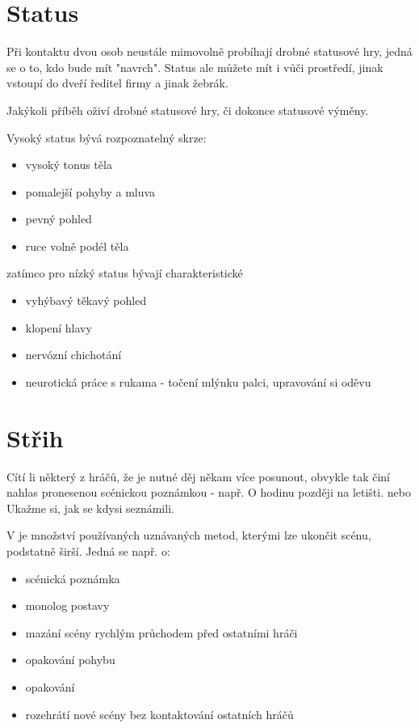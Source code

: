 \documentclass[main.tex]{subfiles}
\begin{document}
 
\needspace{5cm} \section{Status} \label{status} Při kontaktu dvou osob neustále mimovolně probíhají drobné statusové hry, 
jedná se o to, kdo bude mít "navrch". Status ale můžete mít i vůči prostředí, jinak vstoupí do  
dveří ředitel firmy a jinak žebrák. 
 
Jakýkoli příběh oživí drobné statusové hry, či dokonce statusové výměny. 
 
 
Vysoký status bývá rozpoznatelný skrze: 
\begin{itemize}
\item vysoký tonus těla
\item pomalejší pohyby a mluva
\item pevný pohled
\item ruce volně podél těla
\end{itemize}
zatímco pro  nízký status bývají charakteristické 
\begin{itemize}
\item vyhýbavý těkavý pohled
\item klopení hlavy
\item nervózní chichotání
\item neurotická práce s rukama - točení mlýnku palci, upravování si oděvu
\end{itemize}
 
\needspace{5cm} \section{Střih} \label{střih} Cítí li některý z hráčů, že je nutné děj někam více posunout, obvykle tak činí nahlas pronesenou scénickou poznámkou  - např. O hodinu později na letišti.  nebo Ukažme si, jak se kdysi seznámili. 
 
V  je množství používaných uznávaných metod, kterými  lze ukončit scénu, podstatně širší. 
Jedná se např. o: 
 
\begin{itemize}
\item scénická poznámka
\item monolog postavy
\item mazání scény rychlým průchodem před ostatními hráči
\item opakování pohybu
\item opakování 
\item rozehrátí nové scény bez kontaktování ostatních hráčů
\end{itemize}
 
\end{document}
